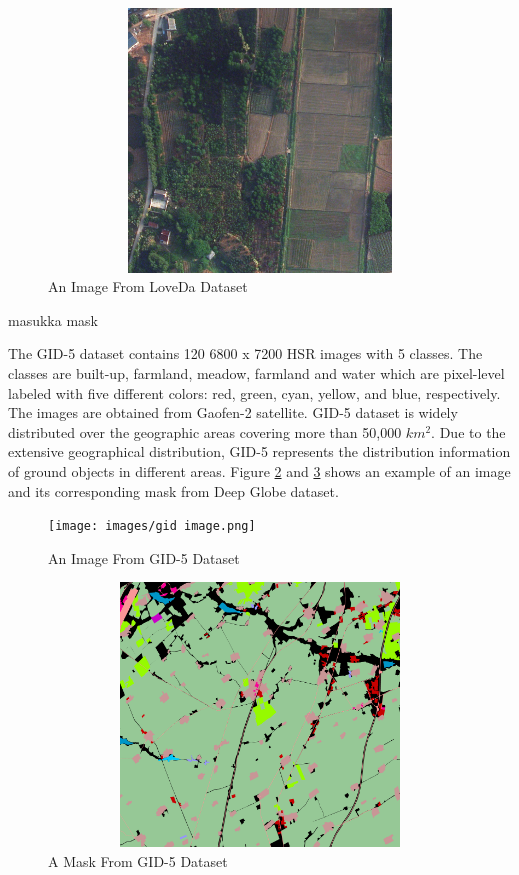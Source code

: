 \FloatBarrier
\begin{figure}[ht]
\includegraphics[width=11.5cm, height=7cm]{images/loveda-image.png}
\centering
\caption{An Image From LoveDa Dataset}
\label{fig:loveda-image}
\end{figure}

masukka mask

The GID-5 dataset \cite{GID2020} contains 120 6800 x 7200 HSR images with 5 classes. The classes are built-up, farmland, meadow, farmland and water which are pixel-level labeled with five different colors: red, green, cyan, yellow,
and blue, respectively. The images are obtained from Gaofen-2 satellite. GID-5 dataset is widely distributed over the geographic areas covering more than 50,000 $km^2$. Due to the extensive geographical distribution, GID-5 represents the distribution information of ground objects in different areas. Figure \ref{fig:gid-image} and \ref{fig:gid-mask} shows an example of an image and its corresponding mask from Deep Globe dataset.

\FloatBarrier
\begin{figure}[ht]
\texttt{[image: images/gid image.png]}
\centering
\caption{An Image From GID-5 Dataset}
\label{fig:gid-image}
\end{figure}

\begin{figure}[ht]
\includegraphics[width=11.5cm, height=7cm]{images/gid mask.png}
\centering
\caption{A Mask From GID-5 Dataset}
\label{fig:gid-mask}
\end{figure}
\FloatBarrier

